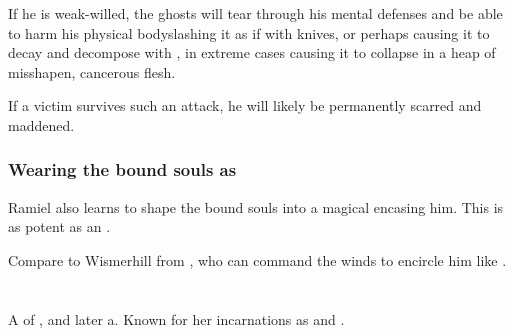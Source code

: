 If he is weak-willed, the ghosts will tear through his mental defenses and be able to harm his physical body\dash slashing it as if with knives, or perhaps causing it to decay and decompose with , in extreme cases causing it to collapse in a heap of misshapen, cancerous flesh. 

If a victim survives such an attack, he will likely be permanently scarred and maddened. 






\subsubsection{Wearing the bound souls as \armour}
Ramiel also learns to shape the bound souls into a magical \armour encasing him. This is as potent as an .

Compare to Wismerhill from \FLuneNoire, who can command the winds to encircle him like \armour. 















\section[Shiaraid]{\Shiaraid}
\index{\Shiaraid}
A \sathariah{} \resvil{} of \Mystraacht, and later a\malach{}. 
Known for her incarnations as  and .








